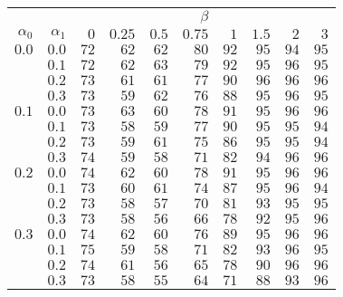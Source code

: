 \begin{tabular}{rr|rrrrrrrr}
\hline\hline
 && \multicolumn{8}{c}{$\beta$}\\
 $\alpha_0$ & $\alpha_1$ & $0$ & $0.25$ & $0.5$ & $0.75$ & $1$ & $1.5$ & $2$ & $3$ \\ 
 \hline
$0.0$ & $0.0$ & $72$ & $62$ & $62$ & $80$ & $92$ & $95$ & $94$ & $95$\\ 
 & $0.1$ & $72$ & $62$ & $63$ & $79$ & $92$ & $95$ & $96$ & $95$\\ 
 & $0.2$ & $73$ & $61$ & $61$ & $77$ & $90$ & $96$ & $96$ & $96$\\ 
 & $0.3$ & $73$ & $59$ & $62$ & $76$ & $88$ & $95$ & $96$ & $95$\\ 
\hline 
 $0.1$ & $0.0$ & $73$ & $63$ & $60$ & $78$ & $91$ & $95$ & $96$ & $96$\\ 
 & $0.1$ & $73$ & $58$ & $59$ & $77$ & $90$ & $95$ & $95$ & $94$\\ 
 & $0.2$ & $73$ & $59$ & $61$ & $75$ & $86$ & $95$ & $95$ & $94$\\ 
 & $0.3$ & $74$ & $59$ & $58$ & $71$ & $82$ & $94$ & $96$ & $96$\\ 
\hline 
 $0.2$ & $0.0$ & $74$ & $62$ & $60$ & $78$ & $91$ & $95$ & $96$ & $96$\\ 
 & $0.1$ & $73$ & $60$ & $61$ & $74$ & $87$ & $95$ & $96$ & $94$\\ 
 & $0.2$ & $73$ & $58$ & $57$ & $70$ & $81$ & $93$ & $95$ & $95$\\ 
 & $0.3$ & $73$ & $58$ & $56$ & $66$ & $78$ & $92$ & $95$ & $96$\\ 
\hline 
 $0.3$ & $0.0$ & $74$ & $62$ & $60$ & $76$ & $89$ & $95$ & $96$ & $96$\\ 
 & $0.1$ & $75$ & $59$ & $58$ & $71$ & $82$ & $93$ & $96$ & $95$\\ 
 & $0.2$ & $74$ & $61$ & $56$ & $65$ & $78$ & $90$ & $96$ & $96$\\ 
 & $0.3$ & $73$ & $58$ & $55$ & $64$ & $71$ & $88$ & $93$ & $96$\\ 
 \hline 
 \end{tabular}